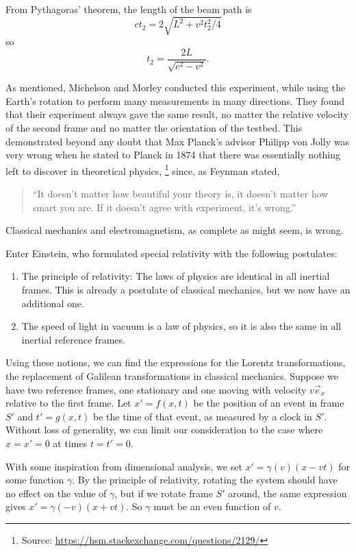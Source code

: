 From Pythagoras' theorem, the length of the beam path is
\[
  c t_2 = 2 \sqrt{L^2 + v^2 t_2^2 / 4}
\]
so
\[
  t_2 = \frac{2 L}{\sqrt{c^2 - v^2}}.
\]

As mentioned, Michelson and Morley conducted this experiment, while using the
Earth's rotation to perform many measurements in many directions.
They found that their experiment always gave the same result, no matter the
relative velocity of the second frame and no matter the orientation of the
testbed.
This demonstrated beyond any doubt that Max Planck's advisor Philipp von Jolly
was very wrong when he stated to Planck in 1874 that there was essentially
nothing left to discover in theoretical physics,%
\footnote{Source: \url{https://hsm.stackexchange.com/questions/2129/}}
since, as Feynman stated,
\begin{quote}
  \enquote{It doesn't matter how beautiful your theory is, it doesn't matter how smart
  you are. If it doesn't agree with experiment, it's wrong.}
\end{quote}
Classical mechanics and electromagnetism, as complete as might seem, is wrong.


Enter Einstein, who formulated special relativity with the following postulates:
\begin{enumerate}
\item The principle of relativity: The laws of physics are identical in all
  inertial frames.
  This is already a postulate of classical mechanics, but we now have an
  additional one.
\item The speed of light in vacuum is a law of physics, so it is also the same
  in all inertial reference frames.
\end{enumerate}
%
Using these notions, we can find the expressions for the Lorentz
transformations, the replacement of Galilean transformations in classical
mechanics.
Suppose we have two reference frames, one stationary and one moving with
velocity $v \vec{e}_x$ relative to the first frame.
Let $x' = f(x, t)$ be the position of an event in frame $S'$ and $t' = g(x,t)$
be the time of that event, as measured by a clock in $S'$.
Without loss of generality, we can limit our consideration to the case where $x
= x' = 0$ at times $t = t' = 0$.

With some inspiration from dimensional analysis, we set $x' = \gamma(v) (x -
vt)$ for some function $\gamma$.
By the principle of relativity, rotating the system should have no effect on the
value of $\gamma$, but if we rotate frame $S'$ around, the same expression gives
$x' = \gamma(-v) (x + vt)$.
So $\gamma$ must be an even function of $v$.


